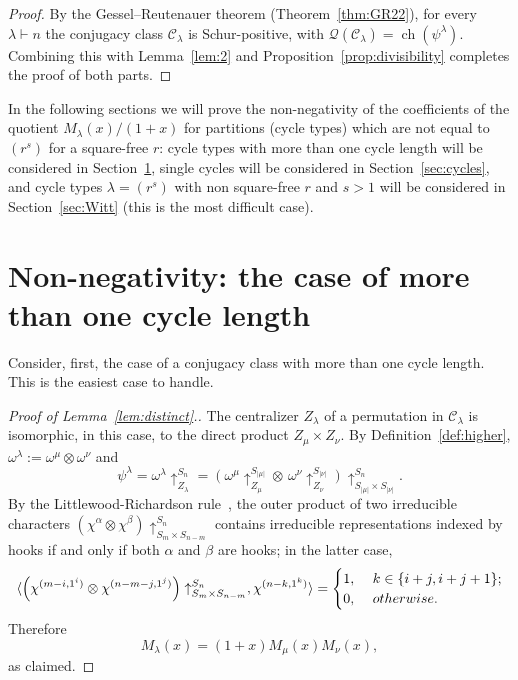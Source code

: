 \documentclass[10pt]{article}
\theoremstyle{definition}
\newcommand{\Q}{\mathcal Q}
\newcommand{\C}{\mathcal C}
\newcommand{\ch}{{\operatorname{ch}}}
\begin{document}
\begin{proof}
    By the Gessel--Reutenauer theorem (Theorem~\ref{thm:GR22}), for every $\lambda\vdash n$ the conjugacy class $\C_\lambda$ 
    is Schur-positive, with $\Q(\C_\lambda) = \ch(\psi^\lambda)$.
    Combining this with Lemma~\ref{lem:2}  and  Proposition~\ref{prop:divisibility} completes the proof of both parts.
\end{proof}

In the following sections we will prove the non-negativity of the coefficients of the quotient $M_\lambda(x)/(1+x)$ for partitions (cycle types) which are not equal to $(r^s)$ for a square-free $r$: 
cycle types with more than one cycle length will be considered in Section~\ref{sec:distinct}, 
single cycles will be considered in Section~\ref{sec:cycles},
and cycle types $\lambda = (r^s)$ with non square-free $r$ and $s>1$ will be considered in Section~\ref{sec:Witt} (this is the most difficult case).


\section{Non-negativity: the case of more than one cycle length}
\label{sec:distinct}

Consider, first, the case of a conjugacy class with more than one cycle length. This is the easiest case to handle.

\begin{proof}[Proof of Lemma~\ref{lem:distinct}.]
    The centralizer $Z_\lambda$ of a permutation in $\C_\lambda$ is isomorphic, in this case, to the direct product $Z_\mu \times Z_\nu$. 
    By Definition~\ref{def:higher}, 
    $\omega^\lambda := \omega^{\mu} \otimes \omega^\nu$ and  
    \begin{equation}\label{eq:distinct}
        \psi^\lambda 
        = \omega^\lambda\uparrow_{Z_\lambda}^{S_n}
        = \left(\omega^{\mu}\uparrow_{Z_{\mu}}^{S_{|\mu|}} \otimes \, 
		\omega^{\nu}\uparrow_{Z_{\nu}}^{S_{|\nu|}}\right)
		\uparrow_{S_{|\mu|}\times S_{|\nu|}}^{S_n}.		    
    \end{equation}
    By the Littlewood-Richardson rule~\cite[Theorem A1.3.3]{EC2}, the outer product  of two irreducible characters 
    $\left( \chi^\alpha\otimes\chi^\beta\right)\uparrow_{S_m\times S_{n-m}}^{S_n}$ 
    contains irreducible representations indexed by hooks if and only if both $\alpha$ and $\beta$ are hooks; in the latter case,
    \[
        \langle \left( \chi^{(m-i,1^i)} \otimes \chi^{(n-m-j,1^j)}\right)\uparrow_{S_m \times S_{n-m}}^{S_n}, \chi^{(n-k,1^k)}\rangle = 
        \begin{cases}
            1, & \ k\in \{i+j, i+j+1\};\\
            0, & \ \rm{otherwise.}
        \end{cases}
    \]
    Therefore
    \[
        M_\lambda(x) = (1+x) M_\mu(x) M_\nu(x),
    \]
    as claimed.
\end{proof}	
\end{document}
